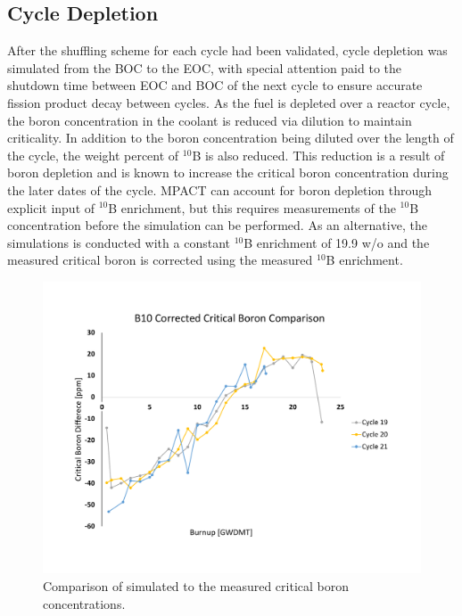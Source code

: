 \documentclass[edeposit,fullpage,12pt]{uiucthesis2009}
\begin{document}
\subsection{Cycle Depletion}
After the shuffling scheme for each cycle had been validated, cycle depletion was simulated from the \gls{BOC} to the \gls{EOC}, with special attention paid to the shutdown time between \gls{EOC} and \gls{BOC} of the next cycle to ensure accurate fission product decay between cycles. 
As the fuel is depleted over a reactor cycle, the boron concentration in the coolant is reduced via dilution to maintain criticality. 
In addition to the boron concentration being diluted over the length of the cycle, the weight percent of $^{10}$B is also reduced. 
This reduction is a result of boron depletion and is known to increase the critical boron concentration during the later dates of the cycle. 
MPACT can account for boron depletion through explicit input of $^{10}$B enrichment, but this requires measurements of the $^{10}$B concentration before the simulation can be performed.
As an alternative, the simulations is conducted with a constant $^{10}$B enrichment of 19.9 w/o and the measured critical boron is corrected using the measured $^{10}$B enrichment.
\begin{figure}
\begin{center}
\includegraphics[trim={0 2cm 0 3.1cm},clip,width=0.5\linewidth]{./Figures/corr_b.pdf}
\end{center}
\caption{Comparison of simulated to the measured critical boron concentrations.}
\label{fig:cor_b}
\end{figure} 
\end{document}
